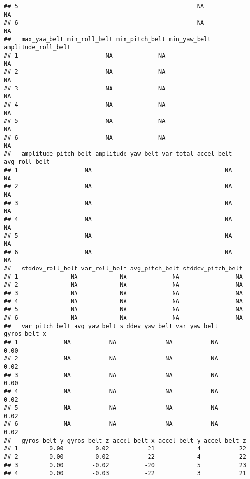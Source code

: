 \documentclass[]{article}
\begin{document}
\begin{verbatim}
## 5                                                   NA             NA
## 6                                                   NA             NA
##   max_yaw_belt min_roll_belt min_pitch_belt min_yaw_belt amplitude_roll_belt
## 1                         NA             NA                               NA
## 2                         NA             NA                               NA
## 3                         NA             NA                               NA
## 4                         NA             NA                               NA
## 5                         NA             NA                               NA
## 6                         NA             NA                               NA
##   amplitude_pitch_belt amplitude_yaw_belt var_total_accel_belt avg_roll_belt
## 1                   NA                                      NA            NA
## 2                   NA                                      NA            NA
## 3                   NA                                      NA            NA
## 4                   NA                                      NA            NA
## 5                   NA                                      NA            NA
## 6                   NA                                      NA            NA
##   stddev_roll_belt var_roll_belt avg_pitch_belt stddev_pitch_belt
## 1               NA            NA             NA                NA
## 2               NA            NA             NA                NA
## 3               NA            NA             NA                NA
## 4               NA            NA             NA                NA
## 5               NA            NA             NA                NA
## 6               NA            NA             NA                NA
##   var_pitch_belt avg_yaw_belt stddev_yaw_belt var_yaw_belt gyros_belt_x
## 1             NA           NA              NA           NA         0.00
## 2             NA           NA              NA           NA         0.02
## 3             NA           NA              NA           NA         0.00
## 4             NA           NA              NA           NA         0.02
## 5             NA           NA              NA           NA         0.02
## 6             NA           NA              NA           NA         0.02
##   gyros_belt_y gyros_belt_z accel_belt_x accel_belt_y accel_belt_z
## 1         0.00        -0.02          -21            4           22
## 2         0.00        -0.02          -22            4           22
## 3         0.00        -0.02          -20            5           23
## 4         0.00        -0.03          -22            3           21

\end{verbatim}
\end{document}
